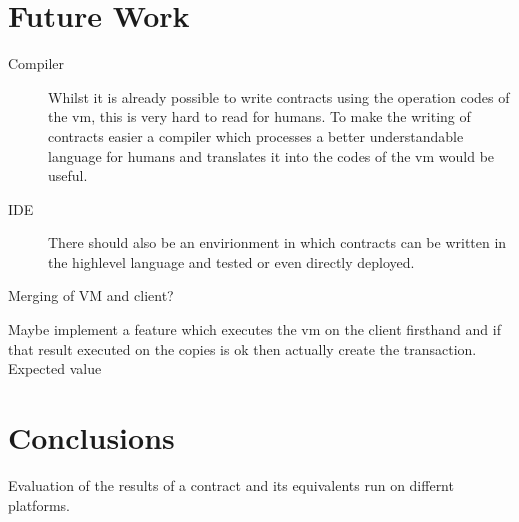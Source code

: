 \section{Future Work}

\begin{description}
  \item[Compiler]  Whilst it is already possible to write contracts using the operation codes of the vm, this is very hard to read for humans. To make the writing of contracts easier a compiler which processes a better understandable language for humans and translates it into the codes of the vm would be useful. 
  \item[IDE] There should also be an envirionment in which contracts can be written in the highlevel language and tested or even directly deployed.
\end{description}


Merging of VM and client?


Maybe implement a feature which executes the vm on the client firsthand and if that result executed on the copies is ok then actually create the transaction. Expected value


\section{Conclusions}
Evaluation of the results of a contract and its equivalents run on differnt platforms.